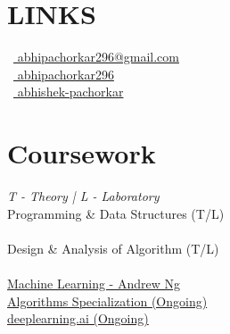 \documentclass[]{deedy-resume-openfont}
\begin{document}
\begin{minipage}[t]{0.33\textwidth}

\section{LINKS} 
\faEnvelope\ {\href{mailto:abhipachorkar296@gmail.com}{ abhipachorkar296@gmail.com}}\\
\faGithub\ {\href{https://github.com/abhipachorkar296}{ abhipachorkar296}}\\
\faLinkedinSquare\ {\href{https://www.linkedin.com/in/abhishek-pachorkar}{ abhishek-pachorkar}}\\


\sectionsep


\section{Coursework}
\emph{T - Theory | L - Laboratory}\\
Programming \& Data Structures (T/L)\\~\\
Design \& Analysis of Algorithm (T/L) \\~\\
\href{https://www.coursera.org/learn/machine-learning}{Machine Learning - Andrew Ng}\\
\href{https://www.coursera.org/specializations/algorithms?}{Algorithms Specialization (Ongoing)}\\
\href{https://www.coursera.org/specializations/deep-learning}{deeplearning.ai (Ongoing)}

\sectionsep



%
%

\end{minipage} 
\hfill
\end{document}
